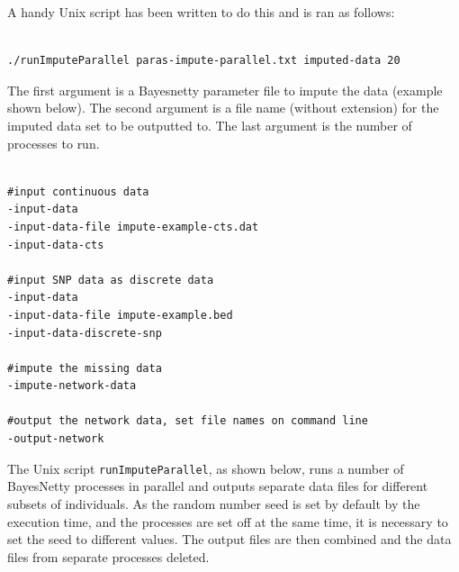 \documentclass[a4paper,12pt]{article}
\newcommand{\code}[1]{{\footnotesize{{\tt #1}}}}
\begin{document}
A handy Unix script has been written to do this and is ran as follows: 
\vspace{0.35cm} \begin{lstlisting}

./runImputeParallel paras-impute-parallel.txt imputed-data 20

\end{lstlisting} \vspace{0.35cm}
The first argument is a Bayesnetty parameter file to impute the data (example shown below). The second argument is a file name (without extension) for the imputed data set to be outputted to. The last argument is the number of processes to run. 
\vspace{0.35cm} \begin{lstlisting}

#input continuous data
-input-data
-input-data-file impute-example-cts.dat
-input-data-cts

#input SNP data as discrete data
-input-data
-input-data-file impute-example.bed
-input-data-discrete-snp

#impute the missing data
-impute-network-data

#output the network data, set file names on command line
-output-network

\end{lstlisting} \vspace{0.35cm}
The Unix script \code{runImputeParallel}, as shown below, runs a number of BayesNetty processes in parallel and outputs separate data files for different subsets of individuals. As the random number seed is set by default by the execution time, and the processes are set off at the same time, it is necessary to set the seed to different values. The output files are then combined and the data files from separate processes deleted. 
\end{document}
